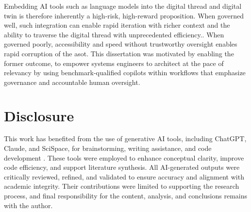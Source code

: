 Embedding AI tools such as language models into the digital thread and digital twin is therefore inherently a high-risk, high-reward proposition. When governed well, such integration can enable rapid iteration with richer context and the ability to traverse the digital thread with unprecedented efficiency.. When governed poorly, accessibility and speed without trustworthy oversight enables rapid corruption of the \ac{asot}. This dissertation was motivated by enabling the former outcome, to empower systems engineers to architect at the pace of relevancy by using benchmark-qualified copilots within workflows that emphasize governance and accountable human oversight.


\chapter*{Disclosure}\label{ch:disclosure}

This work has benefited from the use of generative AI tools, including ChatGPT, Claude, and SciSpace, for brainstorming, writing assistance, and code development \cite{openai_OpenAI_2025, anthropicai_AnthropicHome_2025, scispace_SciSpace_2025}. These tools were employed to enhance conceptual clarity, improve code efficiency, and support literature synthesis. All AI-generated outputs were critically reviewed, refined, and validated to ensure accuracy and alignment with academic integrity. Their contributions were limited to supporting the research process, and final responsibility for the content, analysis, and conclusions remains with the author.
